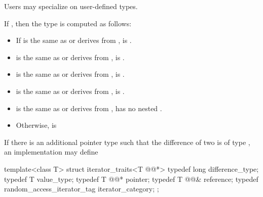 \begin{addedblock}
\pnum
Users may specialize  on user-defined types.

\pnum
If 
, then the
type  is computed as follows:
\begin{itemize}
\item If  is the same as or derives from ,
       is .
\item {}  is the same as or derives from ,
       is .
\item {}  is the same as or derives from ,
       is .
\item {}  is the same as or derives from ,
       is .
\item {}  is the same as or derives from ,
       has no nested .
\item Otherwise,  is 
\end{itemize}
\end{addedblock}

\begin{removedblock}
\pnum
\enternote
If there is an additional pointer type
such that the difference of two
is of type
,
an implementation may define

\begin{codeblock}
  template<class T> struct iterator_traits<T @@*> {
    typedef long difference_type;
    typedef T value_type;
    typedef T @@* pointer;
    typedef T @@& reference;
    typedef random_access_iterator_tag iterator_category;
  };
\end{codeblock}
\exitnote
\end{removedblock}

